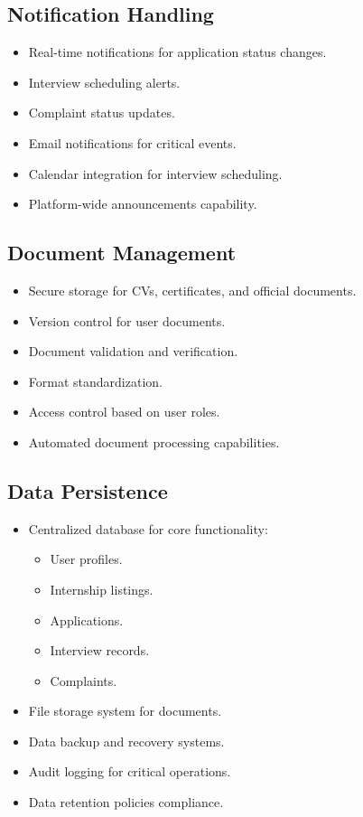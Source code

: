 \subsection{Notification Handling}
\label{subsec:notification_handling}
\begin{itemize}
    \item Real-time notifications for application status changes.
    \item Interview scheduling alerts.
    \item Complaint status updates.
    \item Email notifications for critical events.
    \item Calendar integration for interview scheduling.
    \item Platform-wide announcements capability.
\end{itemize}

\subsection{Document Management}
\label{subsec:document_management}
\begin{itemize}
    \item Secure storage for CVs, certificates, and official documents.
    \item Version control for user documents.
    \item Document validation and verification.
    \item Format standardization.
    \item Access control based on user roles.
    \item Automated document processing capabilities.
\end{itemize}

\subsection{Data Persistence}
\label{subsec:data_persistence}
\begin{itemize}
    \item Centralized database for core functionality:
    \begin{itemize}
        \item User profiles.
        \item Internship listings.
        \item Applications.
        \item Interview records.
        \item Complaints.
    \end{itemize}
    \item File storage system for documents.
    \item Data backup and recovery systems.
    \item Audit logging for critical operations.
    \item Data retention policies compliance.
\end{itemize}

